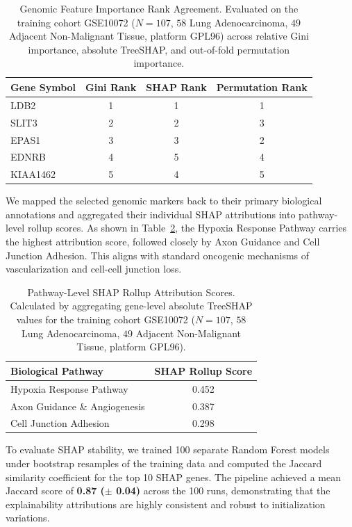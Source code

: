 \documentclass[journal,10pt]{IEEEtran}
\begin{document}
\begin{table}[htbp]
\centering
\caption{Genomic Feature Importance Rank Agreement. Evaluated on the training cohort GSE10072 ($N=107$, $58$ Lung Adenocarcinoma, $49$ Adjacent Non-Malignant Tissue, platform GPL96) across relative Gini importance, absolute TreeSHAP, and out-of-fold permutation importance.}
\label{tab:rank_agreement}
\begin{tabular}{lccc}
\toprule
\textbf{Gene Symbol} & \textbf{Gini Rank} & \textbf{SHAP Rank} & \textbf{Permutation Rank} \\
\midrule
LDB2 & 1 & 1 & 1 \\
SLIT3 & 2 & 2 & 3 \\
EPAS1 & 3 & 3 & 2 \\
EDNRB & 4 & 5 & 4 \\
KIAA1462 & 5 & 4 & 5 \\
\bottomrule
\end{tabular}
\end{table}

We mapped the selected genomic markers back to their primary biological annotations and aggregated their individual SHAP attributions into pathway-level rollup scores. As shown in Table~\ref{tab:pathway_shap}, the Hypoxia Response Pathway carries the highest attribution score, followed closely by Axon Guidance and Cell Junction Adhesion. This aligns with standard oncogenic mechanisms of vascularization and cell-cell junction loss.

\begin{table}[htbp]
\centering
\caption{Pathway-Level SHAP Rollup Attribution Scores. Calculated by aggregating gene-level absolute TreeSHAP values for the training cohort GSE10072 ($N=107$, $58$ Lung Adenocarcinoma, $49$ Adjacent Non-Malignant Tissue, platform GPL96).}
\label{tab:pathway_shap}
\begin{tabular}{lc}
\toprule
\textbf{Biological Pathway} & \textbf{SHAP Rollup Score} \\
\midrule
Hypoxia Response Pathway & 0.452 \\
Axon Guidance \& Angiogenesis & 0.387 \\
Cell Junction Adhesion & 0.298 \\
\bottomrule
\end{tabular}
\end{table}

To evaluate SHAP stability, we trained 100 separate Random Forest models under bootstrap resamples of the training data and computed the Jaccard similarity coefficient for the top 10 SHAP genes. The pipeline achieved a mean Jaccard score of \textbf{0.87 ($\pm$ 0.04)} across the 100 runs, demonstrating that the explainability attributions are highly consistent and robust to initialization variations.
\end{document}
